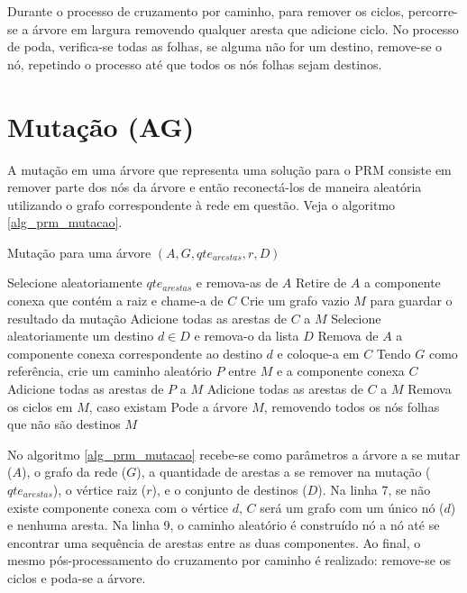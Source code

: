 Durante o processo de cruzamento por caminho, para remover os ciclos, percorre-se a árvore em largura removendo qualquer aresta que adicione ciclo. No processo de poda, verifica-se todas as folhas, se alguma não for um destino, remove-se o nó, repetindo o processo até que todos os nós folhas sejam destinos.

\section{Mutação (AG)}

A mutação em uma árvore que representa uma solução para o PRM consiste em remover parte dos nós da árvore e então reconectá-los de maneira aleatória utilizando o grafo correspondente à rede em questão. Veja o algoritmo \ref{alg_prm_mutacao}.

\begin{algorithm}
	\caption{Mutação para uma árvore $(A, G, qte_{arestas}, r, D)$}
	\label{alg_prm_mutacao}
	\begin{algorithmic}[1]
		\State Selecione aleatoriamente $qte_{arestas}$ e remova-as de $A$
		\State Retire de $A$ a componente conexa que contém a raiz e chame-a de $C$
		\State Crie um grafo vazio $M$ para guardar o resultado da mutação
		\State Adicione todas as arestas de $C$ a $M$
			\State Selecione aleatoriamente um destino $d \in D$ e remova-o da lista $D$
			\State Remova de $A$ a componente conexa correspondente ao destino $d$ e coloque-a em $C$
				\State Tendo $G$ como referência, crie um caminho aleatório $P$ entre $M$ e a componente conexa $C$
				\State Adicione todas as arestas de $P$ a $M$
			\EndIf
			\State Adicione todas as arestas de $C$ a $M$
		\EndWhile
		\State Remova os ciclos em $M$, caso existam
		\State Pode a árvore $M$, removendo todos os nós folhas que não são destinos
		\State \Return $M$
	\end{algorithmic}
\end{algorithm}

No algoritmo \ref{alg_prm_mutacao} recebe-se como parâmetros a árvore a se mutar ($A$), o grafo da rede ($G$), a quantidade de arestas a se remover na mutação ($qte_{arestas}$), o vértice raiz ($r$), e o conjunto de destinos ($D$). Na linha 7, se não existe componente conexa com o vértice $d$, $C$ será um grafo com um único nó ($d$) e nenhuma aresta. Na linha 9, o caminho aleatório é construído nó a nó até se encontrar uma sequência de arestas entre as duas componentes. Ao final, o mesmo pós-processamento do cruzamento por caminho é realizado: remove-se os ciclos e poda-se a árvore.

